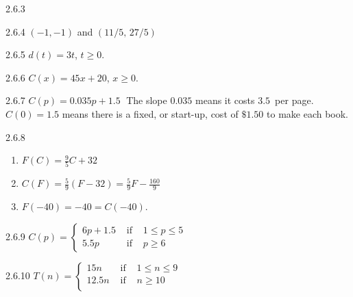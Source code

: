 \begin{Answer}{2.6.3}

\end{Answer}
\begin{Answer}{2.6.4}
		$(-1,-1)$ and $(11/5, \, 27/5)$
	
\end{Answer}
\begin{Answer}{2.6.5}
  $d(t) = 3t$, $t \geq 0$.
	
\end{Answer}
\begin{Answer}{2.6.6}
	$C(x) = 45x+20$, $x \geq 0$.
	
\end{Answer}
\begin{Answer}{2.6.7}
		$C(p) = 0.035p + 1.5 \;$  The slope $0.035$ means it costs $3.5$\textcent \, per page.  $C(0) = 1.5$ means there is a fixed, or start-up, cost of $\$1.50$ to make each book.
	
\end{Answer}
\begin{Answer}{2.6.8}
		\begin{enumerate}

			\item $F(C) = \frac{9}{5}C + 32$
			\item $C(F) = \frac{5}{9}(F - 32) = \frac{5}{9}F - \frac{160}{9}$
			\item $F(-40) = -40 = C(-40)$.

		\end{enumerate}

	
\end{Answer}
\begin{Answer}{2.6.9}
		 ${\displaystyle C(p) = \left\{ \begin{array}{rcl} 6p + 1.5 & \mbox{ if } & 1 \leq p \leq 5 \\
			5.5p & \mbox{ if } & p\geq 6
			\end{array} \right. }$
	
\end{Answer}
\begin{Answer}{2.6.10}
		${\displaystyle T(n) = \left\{ \begin{array}{rcl} 15n & \mbox{ if } & 1 \leq n \leq 9 \\
			12.5n & \mbox{ if } & n \geq 10 \\
			\end{array} \right. }$
	
\end{Answer}

